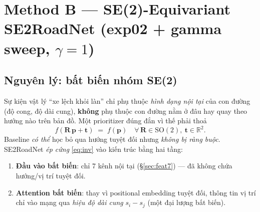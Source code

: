 \documentclass[11pt]{article}
\newcommand{\R}{\mathbb{R}}
\newcommand{\SOtwo}{\mathrm{SO}(2)}
\newcommand{\Rot}{\mathbf{R}}
\newcommand{\pt}{\mathbf{p}}
\newcommand{\tvec}{\mathbf{t}}
\theoremstyle{definition}
\begin{document}
\section{Method B --- SE(2)-Equivariant \textcolor{cB}{SE2RoadNet}
(exp02 + gamma sweep, $\gamma{=}1$)}
\label{sec:methodB}

\subsection{Nguyên lý: bất biến nhóm SE(2)}
Sự kiện vật lý ``xe lệch khỏi làn'' chỉ phụ thuộc \emph{hình dạng nội tại} của
con đường (độ cong, độ dài cung), \textbf{không} phụ thuộc con đường nằm ở đâu
hay quay theo hướng nào trên bản đồ. Một prioritizer đúng đắn vì thế phải thoả
\begin{equation}
\boxed{\,f(\Rot\,\pt + \tvec) \;=\; f(\pt)\quad
\forall\,\Rot\in\SOtwo,\ \tvec\in\R^2.\,}
\label{eq:inv}
\end{equation}
Baseline \emph{có thể} học bỏ qua hướng tuyệt đối nhưng \emph{không bị ràng
buộc}. SE2RoadNet \emph{ép cứng} \eqref{eq:inv} vào kiến trúc bằng hai tầng:
\begin{enumerate}[leftmargin=1.5em]
\item \textbf{Đầu vào bất biến}: chỉ 7 kênh nội tại (\S\ref{sec:feat7}) --- đã
không chứa hướng/vị trí tuyệt đối.
\item \textbf{Attention bất biến}: thay vì positional embedding tuyệt đối, thông
tin vị trí chỉ vào mạng qua \emph{hiệu độ dài cung} $s_i-s_j$ (một đại lượng bất
biến).
\end{enumerate}
\end{document}
